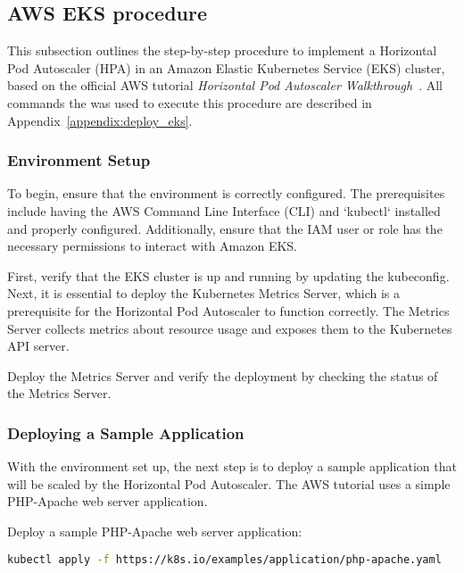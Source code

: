 \subsection{AWS EKS procedure}

This subsection outlines the step-by-step procedure to implement a Horizontal Pod Autoscaler (HPA) in an Amazon Elastic Kubernetes Service (EKS) cluster, based on the official AWS tutorial \textit{Horizontal Pod Autoscaler Walkthrough}~\cite{AwsHorizontalPodAutoescaler}. All commands the was used to execute this procedure are described in Appendix~\ref{appendix:deploy_eks}.

\subsubsection{Environment Setup}

To begin, ensure that the environment is correctly configured. The prerequisites include having the AWS Command Line Interface (CLI) and `kubectl` installed and properly configured. Additionally, ensure that the IAM user or role has the necessary permissions to interact with Amazon EKS.

First, verify that the EKS cluster is up and running by updating the kubeconfig. Next, it is essential to deploy the Kubernetes Metrics Server, which is a prerequisite for the Horizontal Pod Autoscaler to function correctly. The Metrics Server collects metrics about resource usage and exposes them to the Kubernetes API server.

Deploy the Metrics Server and verify the deployment by checking the status of the Metrics Server.

\subsubsection{Deploying a Sample Application}

With the environment set up, the next step is to deploy a sample application that will be scaled by the Horizontal Pod Autoscaler. The AWS tutorial uses a simple PHP-Apache web server application.

Deploy a sample PHP-Apache web server application:

\begin{lstlisting}[language=bash, label={lst:deploy-application}, caption={Deploying PHP application}]
kubectl apply -f https://k8s.io/examples/application/php-apache.yaml
\end{lstlisting}

